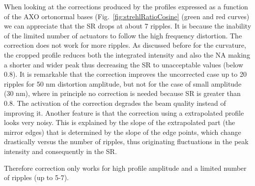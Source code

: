 \documentclass[preprint]{iucr}              %
\begin{document}

When looking at the corrections produced by the profiles expressed as a function of the AXO ortonormal bases (Fig.~\ref{fig:strehlRatioCosine} (green and red curves) we can appreciate that the SR drops at about 7 ripples. It is because the inability of the limited number of actuators to follow the high frequency distortion. The correction does not work for more ripples. As discussed before for the curvature, the cropped profile reduces both the integrated intensity and also the NA making a shorter and wider peak thus decreasing the SR to unacceptable values (below 0.8). It is remarkable that the correction improves the uncorrected case up to 20 ripples for 50 nm distortion amplitude, but not for the case of small amplitude (30 nm), where in principle no correction is needed because SR is greater than 0.8. The activation of the correction degrades the beam quality instead of improving it. 
Another feature is that the correction using a extrapolated profile looks very noisy. This is explained by the slope of the extrapolated part (the mirror edges) that is determined by the slope of the edge points, which change drastically versus the number of ripples, thus originating fluctuations in the peak intensity and consequently in the SR.


Therefore correction only works for high profile amplitude and a limited number of ripples (up to 5-7).
\end{document}
